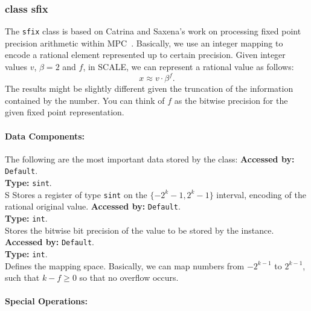 \subsubsection{class sfix}
The \verb|sfix| class is based on Catrina and Saxena's work on processing fixed point precision arithmetic within MPC~\cite{CS10}. Basically, we use an integer mapping to encode a rational element represented up to certain precision. 
Given integer values $v$, $\beta =2$ and $f$, in SCALE, we can represent a rational value as follows:
	\[
	  x \approx v \cdot \beta ^{f}.
	\]
The results might be slightly different given the truncation of the information contained by the number. You can think of $f$ as the bitwise precision for the given fixed point representation.

	\paragraph{Data Components:}
	The following are the most important data stored by the class:
	\textbf{Accessed by:} \verb|Default|.\\
	\textbf{Type:} \verb|sint|.\\
	S	Stores a register of type \verb|sint| on the $\{-2^k-1, 2^k-1\}$ interval, encoding of the rational original value.
	\textbf{Accessed by:} \verb|Default|.\\
	\textbf{Type:} \verb|int|.\\
	Stores the bitwise bit precision of the value to be stored by the instance.
	\textbf{Accessed by:} \verb|Default|.\\
	\textbf{Type:} \verb|int|.\\
	Defines the mapping space. Basically, we can map numbers  from $-2^{k-1}$ to $2^{k-1}$, such that $k-f \geq 0$ so that no overflow occurs.
	
	\paragraph {Special Operations:}

